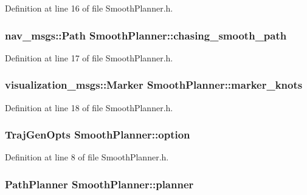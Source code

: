 Definition at line 16 of file Smooth\+Planner.\+h.

\subsubsection[{\texorpdfstring{chasing\+\_\+smooth\+\_\+path}{chasing_smooth_path}}]{\setlength{\rightskip}{0pt plus 5cm}nav\+\_\+msgs\+::\+Path Smooth\+Planner\+::chasing\+\_\+smooth\+\_\+path}\hypertarget{class_smooth_planner_a6a33038c6041ff972bea7765780b56d0}{}\label{class_smooth_planner_a6a33038c6041ff972bea7765780b56d0}


Definition at line 17 of file Smooth\+Planner.\+h.

\subsubsection[{\texorpdfstring{marker\+\_\+knots}{marker_knots}}]{\setlength{\rightskip}{0pt plus 5cm}visualization\+\_\+msgs\+::\+Marker Smooth\+Planner\+::marker\+\_\+knots}\hypertarget{class_smooth_planner_afeeab9ce830d4960babdc84c82da94ea}{}\label{class_smooth_planner_afeeab9ce830d4960babdc84c82da94ea}


Definition at line 18 of file Smooth\+Planner.\+h.

\subsubsection[{\texorpdfstring{option}{option}}]{\setlength{\rightskip}{0pt plus 5cm}Traj\+Gen\+Opts Smooth\+Planner\+::option}\hypertarget{class_smooth_planner_af0c954aea3c6b5b82a160ed4be93fb17}{}\label{class_smooth_planner_af0c954aea3c6b5b82a160ed4be93fb17}


Definition at line 8 of file Smooth\+Planner.\+h.

\subsubsection[{\texorpdfstring{planner}{planner}}]{\setlength{\rightskip}{0pt plus 5cm}Path\+Planner Smooth\+Planner\+::planner}\hypertarget{class_smooth_planner_aa9df69d4f514c7338ab2d066d38dd1a2}{}\label{class_smooth_planner_aa9df69d4f514c7338ab2d066d38dd1a2}


